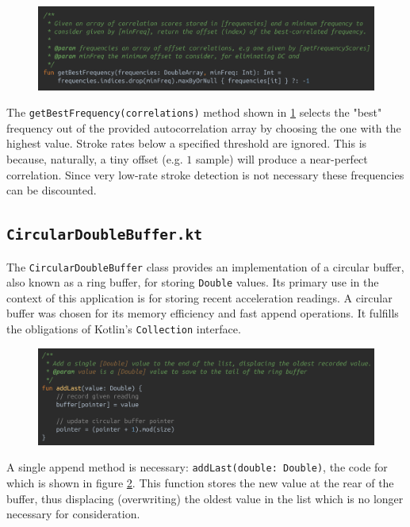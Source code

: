 \documentclass[11pt,twoside,a4paper]{report}
\begin{document}
\begin{figure}[h!]
  \centering
  \includegraphics[width=1.0\textwidth]{code-autocorrelator-getBestFrequency.png}
  \caption{}
  \label{fig:getBestFrequency}
\end{figure}

The \texttt{getBestFrequency(correlations)} method shown in \ref{fig:getBestFrequency} selects the "best" frequency out of the provided autocorrelation array by choosing the one with the highest value. Stroke rates below a specified threshold are ignored. This is because, naturally, a tiny offset (e.g. $1$ sample) will produce a near-perfect correlation. Since very low-rate stroke detection is not necessary these frequencies can be discounted.

\subsection{\texttt{CircularDoubleBuffer.kt}}

The \texttt{CircularDoubleBuffer} class provides an implementation of a circular buffer, also known as a ring buffer, for storing \texttt{Double} values. Its primary use in the context of this application is for storing recent acceleration readings. A circular buffer was chosen for its memory efficiency and fast append operations. It fulfills the obligations of Kotlin's \texttt{Collection} interface.

\begin{figure}[h!]
  \centering
  \includegraphics[width=1.0\textwidth]{code-CircularDoubleBuffer-addLast.png}
  \caption{}
  \label{fig:addLast}
\end{figure}

A single append method is necessary: \texttt{addLast(double: Double)}, the code for which is shown in figure \ref{fig:addLast}. This function stores the new value at the rear of the buffer, thus displacing (overwriting) the oldest value in the list which is no longer necessary for consideration. 
\end{document}

